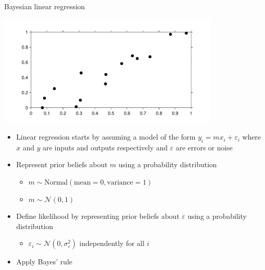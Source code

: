 \begin{frame}{Bayesian linear regression}
    \vspace{\baselineskip}
  \begin{center}
    \includegraphics[width=0.8\textwidth]{../figures/lin_reg/all_data}
  \end{center}
    \vspace{2\baselineskip}
  \begin{itemize}
    \item Linear regression starts by assuming a model of the form $y_i = m x_i + \varepsilon_i$ where $x$ and $y$ are inputs and outputs respectively and $\varepsilon$ are errors or noise
    \vspace{\baselineskip}
    \item Represent prior beliefs about $m$ using a probability distribution
    \begin{itemize}
      \item \eg $m \sim \textrm{Normal}(\textrm{mean} = 0,\textrm{variance} = 1)$
    \end{itemize}
    \begin{itemize}
      \item \eg $m \sim \mathcal{N}(0,1)$
    \end{itemize}
    \vspace{\baselineskip}
    \item Define likelihood by representing prior beliefs about $\varepsilon$ using a probability distribution
    \begin{itemize}
      \item \eg $\varepsilon_i \sim \mathcal{N}(0,\sigma_\varepsilon^2)$ independently for all $i$
    \end{itemize}
    \vspace{\baselineskip}
    \item Apply Bayes' rule
  \end{itemize}
\end{frame}


